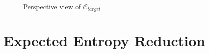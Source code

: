 \documentclass[12pt,draftcls,onecolumn]{IEEEtran}
\begin{document}
\begin{figure}[htp]
  \centering
  \quad
  \quad
  \caption{ Perspective view of $\mathcal{C}_{target}$}
  \label{fig:12}
\end{figure}


\clearpage
\section{Expected Entropy Reduction}
\end{document}
